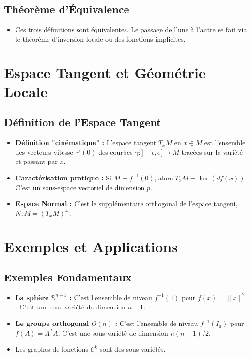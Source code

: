 \documentclass[12pt, a4paper, parskip=full]{report}
\theoremstyle{agregstyle}
\begin{document}
\subsection{Théorème d'Équivalence}
\begin{itemize}
    \item Ces trois définitions sont équivalentes. Le passage de l'une à l'autre se fait via le théorème d'inversion locale ou des fonctions implicites.
\end{itemize}

\section{Espace Tangent et Géométrie Locale}
\subsection{Définition de l'Espace Tangent}
\begin{itemize}
    \item \textbf{Définition "cinématique" :} L'espace tangent $T_x M$ en $x \in M$ est l'ensemble des vecteurs vitesse $\gamma'(0)$ des courbes $\gamma: ]-\epsilon, \epsilon[ \to M$ tracées sur la variété et passant par $x$.
    \item \textbf{Caractérisation pratique :} Si $M=f^{-1}(0)$, alors $T_x M = \ker(df(x))$. C'est un sous-espace vectoriel de dimension $p$.
    \item \textbf{Espace Normal :} C'est le supplémentaire orthogonal de l'espace tangent, $N_x M = (T_x M)^\perp$.
\end{itemize}

\section{Exemples et Applications}
\subsection{Exemples Fondamentaux}
\begin{itemize}
    \item \textbf{La sphère $\mathbb{S}^{n-1}$ :} C'est l'ensemble de niveau $f^{-1}(1)$ pour $f(x)=\|x\|^2$. C'est une sous-variété de dimension $n-1$.
    \item \textbf{Le groupe orthogonal $O(n)$ :} C'est l'ensemble de niveau $f^{-1}(I_n)$ pour $f(A)=A^T A$. C'est une sous-variété de dimension $n(n-1)/2$.
    \item Les graphes de fonctions $\mathcal{C}^k$ sont des sous-variétés.
\end{itemize}
\end{document}
